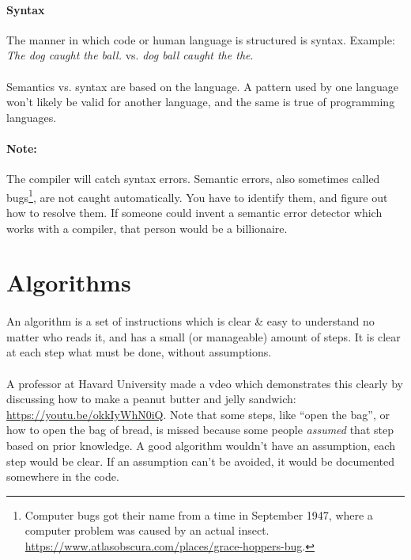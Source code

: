 \documentclass[letter,11pt]{article}
\begin{document}
\paragraph{Syntax} The manner in which code or human language is structured is syntax. Example: \textit{The dog caught the ball.} vs. \textit{dog ball caught the the}.

\paragraph{}Semantics vs. syntax are based on the language. A pattern used by one language won't likely be valid for another language, and the same is true of programming languages.

\paragraph{Note:}The compiler will catch syntax errors. Semantic errors, also sometimes called bugs\footnote{Computer bugs got their name from a time in September 1947, where a computer problem was caused by an actual insect. \url{https://www.atlasobscura.com/places/grace-hoppers-bug}.}, are not caught automatically. You have to identify them, and figure out how to resolve them. If someone could invent a semantic error detector which works with a compiler, that person would be a billionaire.

\section{Algorithms}
\paragraph{}An algorithm is a set of instructions which is clear \& easy to understand no matter who reads it, and has a small (or manageable) amount of steps. It is clear at each step what must be done, without assumptions.

\paragraph{}A professor at Havard University made a vdeo which demonstrates this clearly by discussing how to make a peanut butter and jelly sandwich: \url{https://youtu.be/okkIyWhN0iQ}. Note that some steps, like ``open the bag'', or how to open the bag of bread, is missed because some people \textit{assumed} that step based on prior knowledge. A good algorithm wouldn't have an assumption, each step would be clear. If an assumption can't be avoided, it would be documented somewhere in the code.
\end{document}
